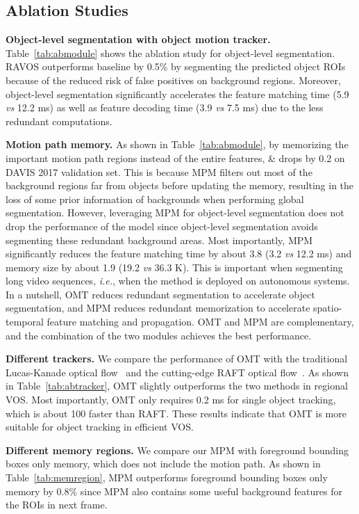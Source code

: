 \documentclass[journal]{IEEEtran}
\def\ie{\emph{i.e.}}
\def\vs{\emph{vs}}
\begin{document}
\subsection{Ablation Studies}

\textbf{Object-level segmentation with object motion tracker.}
Table~\ref{tab:abmodule} shows the ablation study for object-level segmentation. RAVOS outperforms baseline by 0.5\% by segmenting the predicted object ROIs because of the reduced risk of false positives on background regions. Moreover, object-level segmentation significantly accelerates the feature matching time (5.9 \vs{} 12.2 ms) as well as feature decoding time (3.9 \vs{} 7.5 ms) due to the less redundant computations.


\textbf{Motion path memory.}
As shown in Table~\ref{tab:abmodule}, by memorizing the important motion path regions instead of the entire features, \& drops by 0.2 on DAVIS 2017 validation set. This is because MPM filters out most of the background regions far from objects before updating the memory, resulting in the loss of some prior information of backgrounds when performing global segmentation. However, leveraging MPM for object-level segmentation does not drop the performance of the model since object-level segmentation avoids segmenting these redundant background areas. Most importantly, MPM significantly reduces the feature matching time by about 3.8 (3.2 \vs{} 12.2 ms) and memory size by about 1.9 (19.2 \vs{} 36.3 K). This is important when segmenting long video sequences, \ie, when the method is deployed on autonomous systems. In a nutshell, OMT reduces redundant segmentation to accelerate object segmentation, and MPM reduces redundant memorization to accelerate spatio-temporal feature matching and propagation. OMT and MPM are complementary, and the combination of the two modules achieves the best performance.







\textbf{Different trackers.}
We compare the performance of OMT with the traditional Lucas-Kanade optical flow~\cite{LUCAS} and the cutting-edge RAFT optical flow~\cite{RAFT}. As shown in Table~\ref{tab:abtracker}, OMT slightly outperforms the two methods in regional VOS. Most importantly, OMT only requires 0.2 ms for single object tracking, which is about 100 faster than RAFT. These results indicate that OMT is more suitable for object tracking in efficient VOS.

\textbf{Different memory regions.} We compare our MPM with foreground bounding boxes only memory, which does not include the motion path. As shown in Table~\ref{tab:memregion}, MPM outperforms foreground bounding boxes only memory by 0.8\% since MPM also contains some useful background features for the ROIs in next frame.
\end{document}
